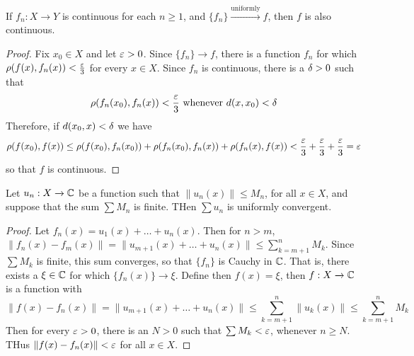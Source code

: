 \begin{theorem}\label{2.5.11}
    If $f_n:X \xrightarrow{} Y$ is continuous for each $n \geq 1$, and
    $\{f_n\} \xrightarrow{\text{uniformly}} f$, then $f$ is also continuous.
\end{theorem}
\begin{proof}
    Fix $x_0 \in X$ and let $\varepsilon>0$. Since  $\{f_n\} \xrightarrow{} f$, there is
    a function $f_n$ for which  $\rho(f(x),f_n(x))<\frac{\varepsilon}{3}$ for every $x
    \in X$. Since  $f_n$ is continuous, there is a  $\delta>0$ such that
    \begin{equation*}
        \rho(f_n(x_0),f_n(x))<\frac{\varepsilon}{3} \text{ whenever } d(x,x_0)<\delta
    \end{equation*}
    Therefore, if $d(x_0,x)<\delta$ we have
    \begin{equation*}
        \rho(f(x_0),f(x)) \leq
        \rho(f(x_0),f_n(x_0))+\rho(f_n(x_0),f_n(x))+\rho(f_n(x),f(x))<
        \frac{\varepsilon}{3}+\frac{\varepsilon}{3}+\frac{\varepsilon}{3}=\varepsilon
    \end{equation*}
    so that $f$ is continuous.
\end{proof}

\begin{theorem}\label{2.5.12}
    Let $u_n:X \xrightarrow{} \mathbb{C}$ be a function such that $\|u_n(x)\| \leq M_n$, for
    all $x \in X$, and suppose that the sum $\sum{M_n}$ is finite. THen $\sum{u_n}$
    is uniformly convergent.
\end{theorem}
\begin{proof}
    Let $f_n(x)=u_1(x)+\dots+u_n(x)$. Then for $n>m$,
    $\|f_n(x)-f_m(x)\|=\|u_{m+1}(x)+\dots+u_n(x)\| \leq \sum_{k=m+1}^n{M_k}$.
    Since $\sum{M_k}$ is finite, this sum converges, so that $\{f_n\}$ is
    Cauchy in $\mathbb{C}$. That is, there exists a  $\xi \in \mathbb{C}$ for which  $\{f_n(x)\}
    \xrightarrow{} \xi$. Define then $f(x)=\xi$, then $f:X \xrightarrow{} \mathbb{C}$ is
    a function with
    \begin{equation*}
        \|f(x)-f_n(x)\|=\|u_{m+1}(x)+\dots+u_n(x)\| \leq \sum_{k=m+1}^n{\|u_k(x)\|}
        \leq \sum_{k=m+1}^n{M_k}
    \end{equation*}
    Then for every $\varepsilon>0$, there is an  $N>0$ such that  $\sum{M_k}<\varepsilon$,
    whenever $n \geq N$. THus  $\|f(x)-f_n(x)\|<\varepsilon$ for all $x \in X$.
\end{proof}
